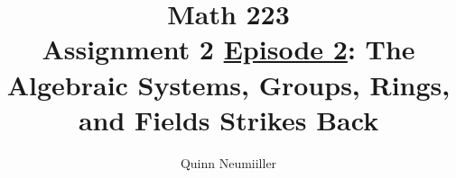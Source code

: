 


% 
% 

 
\title{Math 223 \\
Assignment 2 \underline{Episode 2}: The Algebraic Systems, Groups, Rings, and Fields Strikes Back
}
\author{Quinn Neumiiller} %
 
\maketitle


